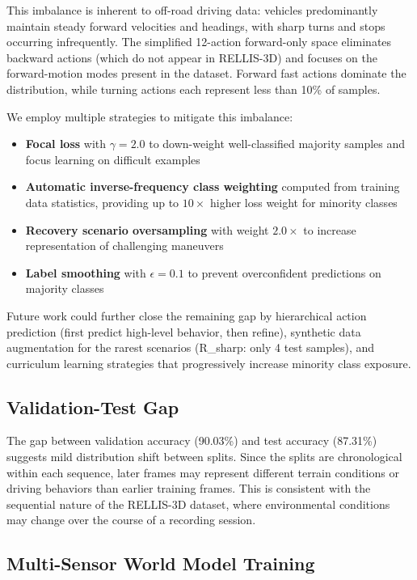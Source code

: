 \documentclass[sensors,article,submit,pdftex,moreauthors]{Definitions/mdpi}
\begin{document}
This imbalance is inherent to off-road driving data: vehicles predominantly maintain steady forward velocities and headings, with sharp turns and stops occurring infrequently. The simplified 12-action forward-only space eliminates backward actions (which do not appear in RELLIS-3D) and focuses on the forward-motion modes present in the dataset. Forward fast actions dominate the distribution, while turning actions each represent less than 10\% of samples.

We employ multiple strategies to mitigate this imbalance:
\begin{itemize}
    \item \textbf{Focal loss} \cite{lin2017} with $\gamma = 2.0$ to down-weight well-classified majority samples and focus learning on difficult examples
    \item \textbf{Automatic inverse-frequency class weighting} computed from training data statistics, providing up to $10\times$ higher loss weight for minority classes
    \item \textbf{Recovery scenario oversampling} with weight $2.0\times$ to increase representation of challenging maneuvers
    \item \textbf{Label smoothing} with $\epsilon = 0.1$ to prevent overconfident predictions on majority classes
\end{itemize}

Future work could further close the remaining gap by hierarchical action prediction (first predict high-level behavior, then refine), synthetic data augmentation for the rarest scenarios (R\_sharp: only 4 test samples), and curriculum learning strategies that progressively increase minority class exposure.

\subsection{Validation-Test Gap}

The gap between validation accuracy (90.03\%) and test accuracy (87.31\%) suggests mild distribution shift between splits. Since the splits are chronological within each sequence, later frames may represent different terrain conditions or driving behaviors than earlier training frames. This is consistent with the sequential nature of the RELLIS-3D dataset, where environmental conditions may change over the course of a recording session.

\subsection{Multi-Sensor World Model Training}
\end{document}
